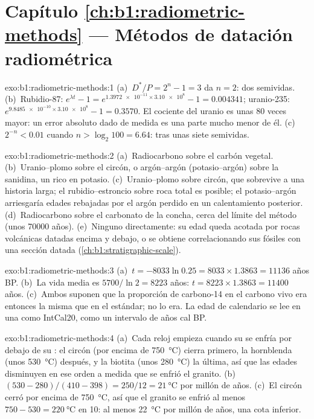 \section*{Capítulo \ref{ch:b1:radiometric-methods} --- Métodos de datación radiométrica}

\begin{solution}{exo:b1:radiometric-methods:1}
(a)~$D^*/P = 2^n - 1 = 3$ da $n = 2$: dos semividas. (b)~Rubidio-87:
$e^{\lambda t} - 1 = e^{\num{1.3972e-11} \times \num{3.10e8}} - 1 = 0.004341$;
uranio-235: $e^{\num{9.8485e-10} \times \num{3.10e8}} - 1 = 0.3570$. El
cociente del uranio es unas 80 veces mayor: un error absoluto dado de medida es una parte mucho menor de él. (c)~$2^{-n} < 0.01$ cuando $n > \log_2 100 = 6.64$: tras
unas siete semividas.
\end{solution}

\begin{solution}{exo:b1:radiometric-methods:2}
(a)~Radiocarbono sobre el carbón vegetal. (b)~Uranio--plomo sobre el circón, o
argón--argón (potasio--argón) sobre la sanidina, un  rico en potasio.
(c)~Uranio--plomo sobre circón, que sobrevive a una historia larga; el rubidio--estroncio sobre roca total es posible; el potasio--argón arriesgaría edades rebajadas por el argón perdido en un calentamiento posterior. (d)~Radiocarbono sobre el carbonato de la concha, cerca del límite del método (unos \num{70000} años). (e)~Ninguno directamente: su edad queda acotada por rocas volcánicas datadas encima y debajo, o se obtiene correlacionando sus fósiles con una sección datada (\cref{ch:b1:stratigraphic-scale}).
\end{solution}

\begin{solution}{exo:b1:radiometric-methods:3}
(a)~$t = -8033 \ln 0.25 = 8033 \times 1.3863 = \num{11136}$ años BP.
(b)~La vida media es $5700/\ln 2 = \num{8223}$ años: $t = 8223 \times 1.3863 =
\num{11400}$ años. (c)~Ambos suponen que la proporción de carbono-14 en el carbono vivo era entonces la misma que en el estándar; no lo era. La edad de calendario se lee
en una  como IntCal20, como un intervalo de años cal BP.
\end{solution}

\begin{solution}{exo:b1:radiometric-methods:4}
(a)~Cada reloj empieza cuando su  se enfría por debajo de su :
el circón (por encima de \qty{750}{\celsius}) cierra primero, la hornblenda (unos
\qty{530}{\celsius}) después, y la biotita (unos \qty{280}{\celsius}) la última, así que las edades disminuyen en ese orden a medida que se enfrió el granito. (b)~$(530 - 280)/(410 - 398) =
250/12 = \qty{21}{\celsius}$ por millón de años. (c)~El circón cerró por encima de
\qty{750}{\celsius}, así que el granito se enfrió al menos $750 - 530 =
\qty{220}{\celsius}$ en \qty{10}{\Myr}: al menos \qty{22}{\celsius} por millón de
años, una cota inferior.
\end{solution}

